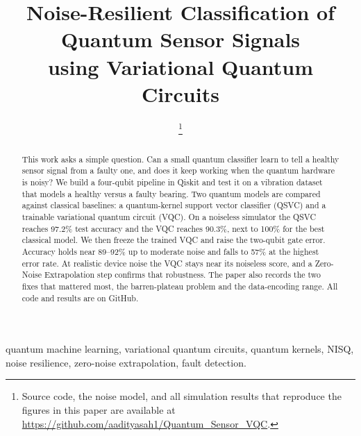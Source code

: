 \documentclass[conference,10pt]{IEEEtran}
\begin{document}
\title{Noise-Resilient Classification of Quantum Sensor Signals\\
using Variational Quantum Circuits}

\author{%
  \thanks{Source code, the noise model, and all simulation results that reproduce
  the figures in this paper are available at
  \url{https://github.com/aadityasah1/Quantum_Sensor_VQC}.}}

\maketitle

\begin{abstract}
This work asks a simple question. Can a small quantum classifier learn to tell
a healthy sensor signal from a faulty one, and does it keep working when the
quantum hardware is noisy? We build a four-qubit pipeline in Qiskit and test it
on a vibration dataset that models a healthy versus a faulty bearing. Two
quantum models are compared against classical baselines: a quantum-kernel
support vector classifier (QSVC) and a trainable variational quantum circuit
(VQC). On a noiseless simulator the QSVC reaches 97.2\% test accuracy and the
VQC reaches 90.3\%, next to 100\% for the best classical model. We then freeze
the trained VQC and raise the two-qubit gate error. Accuracy holds near 89--92\%
up to moderate noise and falls to 57\% at the highest error rate. At realistic
device noise the VQC stays near its noiseless score, and a Zero-Noise
Extrapolation step confirms that robustness. The paper also records the two fixes that mattered most, the
barren-plateau problem and the data-encoding range. All code and results are on
GitHub.
\end{abstract}

\begin{IEEEkeywords}
quantum machine learning, variational quantum circuits, quantum kernels, NISQ,
noise resilience, zero-noise extrapolation, fault detection.
\end{IEEEkeywords}

\end{document}
